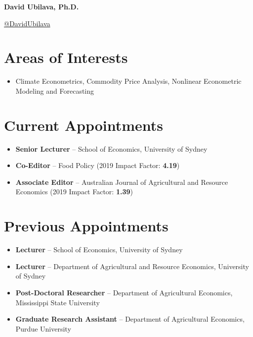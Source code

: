 \documentclass[10pt]{article}
\begin{document}
	
	
	
	\hspace{0.38in}\Large{\bfseries{David Ubilava, Ph.D.}}
	
	\medskip
	
	\hspace{0.38in}\large{\href{https://twitter.com/DavidUbilava}{@DavidUbilava}}
	
	\normalsize

	\medskip

	
	
	\section*{Areas of Interests}
	\begin{itemize}
		\item Climate Econometrics, Commodity Price Analysis, Nonlinear Econometric Modeling and Forecasting
	\end{itemize}
	
	
	\section*{Current Appointments}
	\begin{itemize}
		\item {} \textbf{Senior Lecturer} -- School of Economics, University of Sydney
		\item {} \textbf{Co-Editor} -- Food Policy (2019 Impact Factor: \textbf{4.19})
		\item {} \textbf{Associate Editor} -- Australian Journal of Agricultural and Resource Economics (2019 Impact Factor: \textbf{1.39})
	\end{itemize}

	\section*{Previous Appointments}
	\begin{itemize}
		\item {} \textbf{Lecturer} -- School of Economics, University of Sydney
		\item {} \textbf{Lecturer} -- Department of Agricultural and Resource Economics, University of Sydney
		\item {} \textbf{Post-Doctoral Researcher} -- Department of Agricultural Economics, Mississippi State University
		\item {} \textbf{Graduate Research Assistant} -- Department of Agricultural Economics, Purdue University
	\end{itemize}
	
\end{document}

